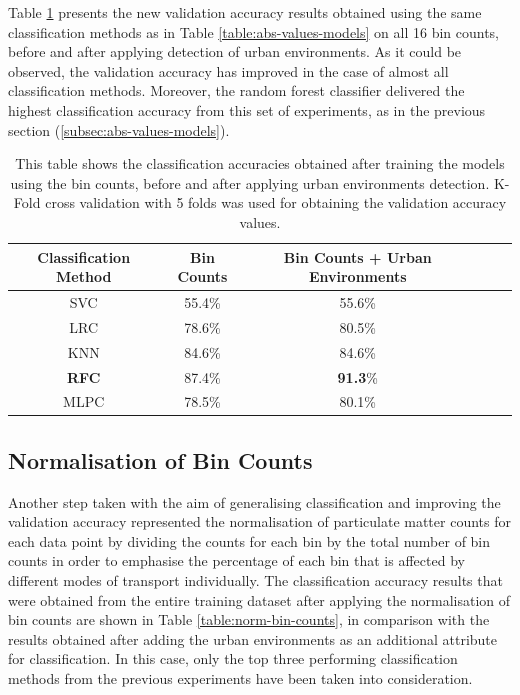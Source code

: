 \documentclass[bsc,frontabs,twoside,singlespacing,parskip,deptreport]{infthesis}     %
\begin{document}
Table \ref{table:urban-env-models} presents the new validation accuracy results obtained using the same classification methods as in Table \ref{table:abs-values-models} on all 16 bin counts, before and after applying detection of urban environments. As it could be observed, the validation accuracy has improved in the case of almost all classification methods. Moreover, the random forest classifier delivered the highest classification accuracy from this set of experiments, as in the previous section (\ref{subsec:abs-values-models}).

\begin{table}[h!]
\centering
 \begin{tabular}{||c | c | c | c | c | c||} 
 \hline
 Classification Method & Bin Counts & Bin Counts + Urban Environments \\ [0.5ex] 
 \hline\hline
 SVC & 55.4\% & 55.6\% \\ 
 \hline
 LRC & 78.6\% & 80.5\% \\
 \hline
 KNN & 84.6\% & 84.6\% \\ 
 \hline
 \textbf{RFC} & 87.4\% & \textbf{91.3}\% \\ 
 \hline
  MLPC & 78.5\% & 80.1\% \\ 
 \hline
\end{tabular}
\caption{This table shows the classification accuracies obtained after training the models using the bin counts, before and after applying urban environments detection. K-Fold cross validation with 5 folds was used for obtaining the validation accuracy values.}
\label{table:urban-env-models}
\end{table}


\subsection{Normalisation of Bin Counts}
\label{subsec:norm-bin-counts-results}

Another step taken with the aim of generalising classification and improving the validation accuracy represented the normalisation of particulate matter counts for each data point by dividing the counts for each bin by the total number of bin counts in order to emphasise the percentage of each bin that is affected by different modes of transport individually. The classification accuracy results that were obtained from the entire training dataset after applying the normalisation of bin counts are shown in Table \ref{table:norm-bin-counts}, in comparison with the results obtained after adding the urban environments as an additional attribute for classification. In this case, only the top three performing classification methods from the previous experiments have been taken into consideration.
\end{document}
